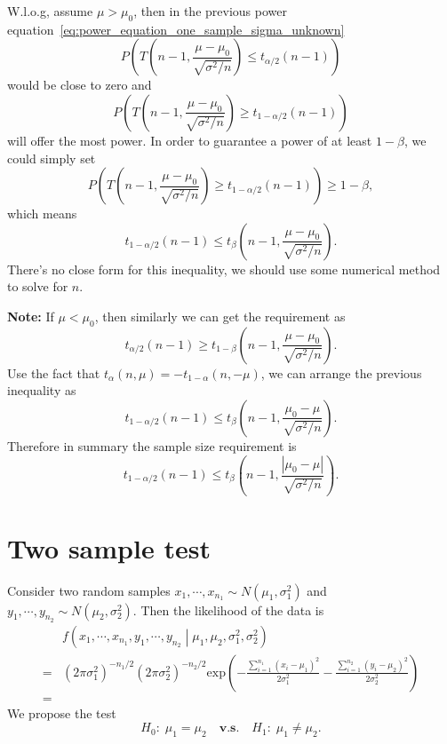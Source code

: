 \documentclass[a4paper,12pt]{article}
\begin{document}
W.l.o.g, assume $\mu > \mu_0$, then in the previous power equation~\eqref{eq:power_equation_one_sample_sigma_unknown}
\[
  P\left(
    T\left(n - 1,  \frac{\mu - \mu_0}{\sqrt{\sigma^2 / n}}\right)
    \leq t_{\alpha / 2}\left(n - 1\right)
  \right)
\]
would be close to zero and
\[
  P\left(
    T\left(n - 1,  \frac{\mu - \mu_0}{\sqrt{\sigma^2 / n}}\right)
    \geq t_{1 - \alpha / 2}\left(n - 1\right)
  \right)
\]
will offer the most power. In order to guarantee a power of at least $1 - \beta$, we could simply set
\[
  P\left(
    T\left(n - 1,  \frac{\mu - \mu_0}{\sqrt{\sigma^2 / n}}\right)
    \geq t_{1 - \alpha / 2}\left(n - 1\right)
  \right)
  \geq 1 - \beta
  , 
\]
which means
\[
  t_{1 - \alpha / 2}\left(n - 1\right)
  \leq t_{\beta}\left(n - 1, \frac{\mu - \mu_0}{\sqrt{\sigma^2 / n}}\right)
  .
\]
There's no close form for this inequality, we should use some numerical method to solve for $n$.
\par
\textbf{Note: } If $\mu < \mu_0$, then similarly we can get the requirement as
\[
  t_{\alpha / 2}\left(n - 1\right) \geq t_{1 - \beta}\left(n - 1, \frac{\mu - \mu_0}{\sqrt{\sigma^2 / n}}\right)
  .
\]
Use the fact that $t_{\alpha}\left(n, \mu\right) = -t_{1 - \alpha}\left(n, -\mu\right)$, we can arrange the previous inequality as
\[
  t_{1 - \alpha / 2}\left(n - 1\right)
  \leq
  t_{\beta}\left(n - 1, \frac{\mu_0 - \mu}{\sqrt{\sigma^2 / n}}\right)
  .
\]
Therefore in summary the sample size requirement is
\[
  t_{1 - \alpha / 2}\left(n - 1\right)
  \leq
  t_{\beta}\left(n - 1, \frac{\left|\mu_0 - \mu\right|}{\sqrt{\sigma^2 / n}}\right)
  .
\]

\section{Two sample test}
\label{sec:two-sample-test}

Consider two random samples $x_1, \cdots, x_{n_1} \sim N\left(\mu_1, \sigma_1^2\right)$ and $y_1, \cdots, y_{n_2}\sim N\left(\mu_2, \sigma_2^2\right)$. Then the likelihood of the data is
\[
  \begin{aligned}
    & f\left(x_1, \cdots, x_{n_1}, y_1, \cdots, y_{n_2}
      \middle|\mu_1, \mu_2, \sigma_1^2, \sigma_2^2\right)    \\
    =& \left( 2\pi\sigma_1^2\right)^{-n_1 / 2}
       \left(2\pi\sigma_2^2\right)^{-n_2 / 2}
       \mathrm{exp}\left(
       - \frac{\sum\limits_{i = 1}^{n_1}\left(x_i - \mu_1\right)^2}{2\sigma_1^2}
       - \frac{\sum\limits_{i = 1}^{n_2}\left(y_i - \mu_2\right)^2}{2\sigma_2^2}
       \right)    \\
    =& 
  \end{aligned}
\]
We propose the test
\[
  H_0:\; \mu_1 = \mu_2
  \quad\textbf{v.s.}\quad
  H_1:\; \mu_1 \neq \mu_2
  .
\]
\end{document}
